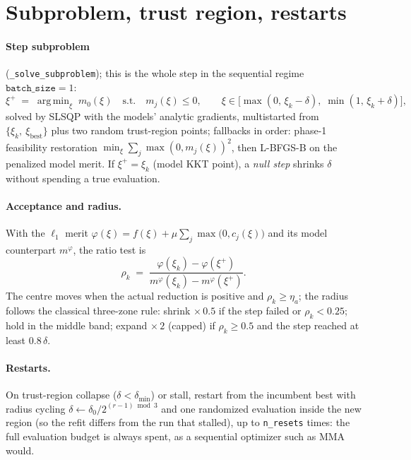 \documentclass[11pt,a4paper]{article}
\newcommand{\code}[1]{\texttt{#1}}
\newcommand{\xxi}{\xi}
\DeclareMathOperator*{\argmin}{arg\,min}
\begin{document}
\section{Subproblem, trust region, restarts}
\paragraph{Step subproblem} (\code{\_solve\_subproblem}); this is the whole
step in the sequential regime $\code{batch\_size}=1$:
\begin{equation}
\xxi^{+} \;=\; \argmin_{\xxi}\; m_0(\xxi)
\quad \text{s.t.} \quad m_j(\xxi) \le 0,\qquad
\xxi \in \bigl[\max(0,\, \xxi_k - \delta),\; \min(1,\, \xxi_k + \delta)\bigr],
\end{equation}
solved by SLSQP with the models' analytic gradients, multistarted from
$\{\xxi_k,\ \xxi_{\mathrm{best}}\}$ plus two random trust-region points;
fallbacks in order: phase-1 feasibility restoration
$\min_\xxi \sum_j \max(0, m_j(\xxi))^2$, then L-BFGS-B on the penalized model
merit. If $\xxi^{+} = \xxi_k$ (model KKT point), a \emph{null step} shrinks
$\delta$ without spending a true evaluation.

\paragraph{Acceptance and radius.} With the $\ell_1$ merit
$\varphi(\xxi) = f(\xxi) + \mu \sum_j \max\bigl(0, c_j(\xxi)\bigr)$ and its
model counterpart $m^{\varphi}$, the ratio test is
\begin{equation}
\rho_k \;=\; \frac{\varphi(\xxi_k) - \varphi(\xxi^{+})}
{m^{\varphi}(\xxi_k) - m^{\varphi}(\xxi^{+})}.
\end{equation}
The centre moves when the actual reduction is positive and
$\rho_k \ge \eta_a$; the radius follows the classical three-zone rule:
shrink $\times\,0.5$ if the step failed or $\rho_k < 0.25$; hold in the
middle band; expand $\times\,2$ (capped) if $\rho_k \ge 0.5$ and the step
reached at least $0.8\,\delta$.

\paragraph{Restarts.} On trust-region collapse ($\delta < \delta_{\min}$) or
stall, restart from the incumbent best with radius cycling
$\delta \leftarrow \delta_0 / 2^{(r-1) \bmod 3}$ and one randomized
evaluation inside the new region (so the refit differs from the run that
stalled), up to \code{n\_resets} times: the full evaluation budget is always
spent, as a sequential optimizer such as MMA would.
\end{document}
